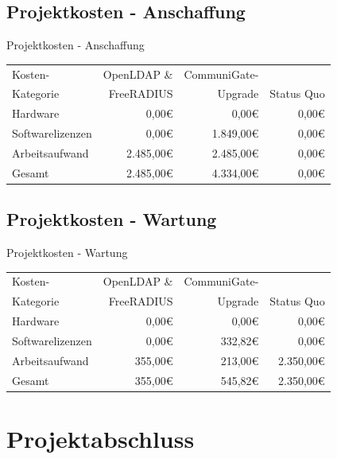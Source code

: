 \documentclass[handout,svgnames]{beamer}
\newcommand{\mcc}[2]{\multicolumn{#1}{|c|}{#2}} %
\begin{document}
\subsection{Projektkosten - Anschaffung}
\begin{frame}{Projektkosten - Anschaffung}
	\begin{tabularx}{\textwidth}{|X|r|r|r|}
		\hline
		Kosten-	&	OpenLDAP \& &	\centering CommuniGate- &	\\
		Kategorie	&	FreeRADIUS &	\centering Upgrade &	Status Quo\\
		\hline
		Hardware &	0,00\euro{} &	0,00\euro{} &	0,00\euro{}\\
		\hline
		Softwarelizenzen &	0,00\euro{} &	1.849,00\euro{} &	0,00\euro{}\\
		\hline
		Arbeitsaufwand &	2.485,00\euro{} &	2.485,00\euro{} &	0,00\euro{}\\
		\hhline{|=|=|=|=|}
		Gesamt &	2.485,00\euro{} &	4.334,00\euro{} &	0,00\euro{}\\
		\hline
	\end{tabularx}
\end{frame}


\subsection{Projektkosten - Wartung}
\begin{frame}{Projektkosten - Wartung}
	\begin{tabularx}{\textwidth}{|X|r|r|r|}
		\hline
		Kosten-	&	OpenLDAP \& &	CommuniGate- &	\\
		Kategorie	&	FreeRADIUS &	Upgrade &	Status Quo\\
		\hline
		Hardware &	0,00\euro{} &	0,00\euro{} &	0,00\euro{}\\
		\hline
		Softwarelizenzen &	0,00\euro{} &	332,82\euro{} &	0,00\euro{}\\
		\hline
		Arbeitsaufwand &	355,00\euro{} &	213,00\euro{} &	2.350,00\euro{}\\
		\hhline{|=|=|=|=|}
		Gesamt &	355,00\euro{} &	545,82\euro{} &	2.350,00\euro{}\\
		\hline
	\end{tabularx}
\end{frame}


\section{Projektabschluss}
\end{document}
